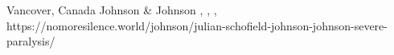           {Vancover, Canada}
          {}
          {Johnson \& Johnson}
          {}
          {
            ,
            ,
            ,
          }
          {https://nomoresilence.world/johnson/julian-schofield-johnson-johnson-severe-paralysis/}

